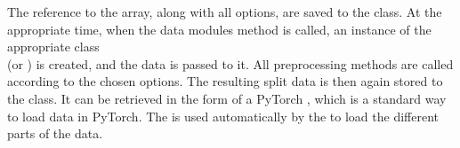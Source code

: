 \documentclass[review]{AIM_report}
\begin{document}
The reference to the \numpy array, along with all options, are saved to the class. At the appropriate time, when the data modules \setup method is called, an instance of the appropriate class\\
(\forecastingDataSet or \classificationDataSet) is created, and the data is passed to it. All preprocessing methods are called according to the chosen options. The resulting split data is then again stored to the \rustDM class. It can be retrieved in the form of a PyTorch \dataLoader, which is a standard way to load data in PyTorch. The \dataLoader is used automatically by the \lightningModule to load the different parts of the data.

\newpage
\pagestyle{empty}



\newpage
\pagestyle{empty}



\newpage
\pagestyle{empty}


\end{document}
